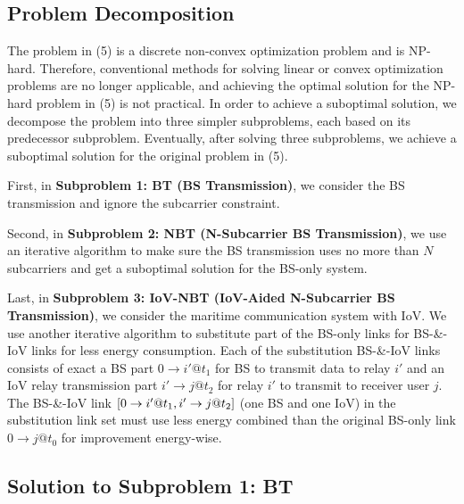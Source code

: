 \documentclass{ieeeaccess}
\begin{document}

\subsection{Problem Decomposition}

The problem in (5) is a discrete non-convex optimization problem and is NP-hard. Therefore, conventional methods for solving linear or convex optimization problems are no longer applicable, and achieving the optimal solution for the NP-hard problem in (5) is not practical. 
In order to achieve a suboptimal solution, we decompose the problem into three simpler subproblems, each based on its predecessor subproblem. Eventually, after solving three subproblems, we achieve a suboptimal solution for the original problem in (5).

First, in \textbf{Subproblem 1: BT (BS Transmission)}, we consider the BS transmission and ignore the subcarrier constraint. 

Second, in \textbf{Subproblem 2: NBT (N-Subcarrier BS Transmission)}, we use an iterative algorithm to make sure the BS transmission uses no more than $N$ subcarriers and get a suboptimal solution for the BS-only system. 

Last, in \textbf{Subproblem 3: IoV-NBT (IoV-Aided N-Subcarrier BS Transmission)}, we consider the maritime communication system with IoV. We use another iterative algorithm to substitute part of the BS-only links for BS-\&-IoV links for less energy consumption. Each of the substitution BS-\&-IoV links consists of exact a BS part $0 \to i'@{t_1}$ for BS to transmit data to relay ${i'}$ and an IoV relay transmission part $i' \to j@{t_2}$ for relay ${i'}$ to transmit to receiver user $j$. The BS-\&-IoV link $\left[ {{\rm{0}} \to i'@{t_1},i' \to j@{t_2}} \right]$ (one BS and one IoV) in the substitution link set must use less energy combined than the original BS-only link $0 \to j@{t_0}$ for improvement energy-wise. 

\subsection{Solution to \textbf{Subproblem 1: BT}}
\end{document}
